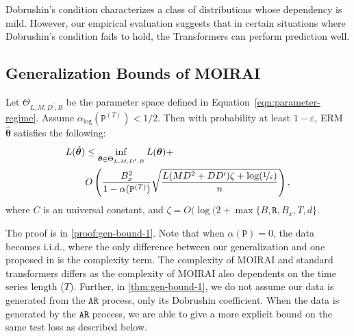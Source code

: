 \begin{remark}
    Dobrushin's condition characterizes a class of distributions whose dependency is mild. 
    However, our empirical evaluation suggests that in certain situations where Dobrushin's condition fails to hold, the Transformers can perform prediction well.
\end{remark}
\subsection{Generalization Bounds of MOIRAI}

\begin{theorem}\label{thm:gen-bound-1}
    Let $\Theta_{L,M,D^\prime, B}$ be the parameter space defined in 
    Equation~\ref{eqn:parameter-regime}.
    Assume $\alpha_{\log}( \mathtt{P}^{(T)}) < 1/2$.
    Then with probability at least $1 - \varepsilon$, ERM $\hat{\bm{\theta}}$ satisfies the following:
    \begin{align*}
    L(\hat{\bm{\theta}})
    &\leq 
    \inf_{\bm{\theta} \in \Theta_{L,M,D^\prime, B}} L(\bm{\theta})
    +
    \\
    &
    O
    \left(
    \frac{B_x^2}{1 - \alpha(\mathtt{P}^{(T)}) }
    \sqrt{
    \frac{
    L(MD^2 + D D^\prime) \zeta + \log(\nicefrac{1}{\varepsilon})
    }{n}
    }
    \right),
    \end{align*}
    where $C$ is an universal constant, and $\zeta = O(\log(2 + \max \{ B, \mathtt{R}, B_x, T, d \}$. 
\end{theorem}

The proof is in \cref{proof:gen-bound-1}.
Note that when $\alpha(\mathtt{P}) = 0$, the data becomes i.i.d., where the only difference between our generalization and one proposed in \cite{bai2024transformers} is the complexity term. 
The complexity of MOIRAI and standard transformers differs as the complexity of MOIRAI also dependents on the time series length ($T$).
Further, in \cref{thm:gen-bound-1}, we do not assume our data is generated from the $\mathtt{AR}$ process, only its Dobrushin coefficient.
When the data is generated by the $\mathtt{AR}$ process, we are able to give a more explicit bound on the same test loss as described below.

